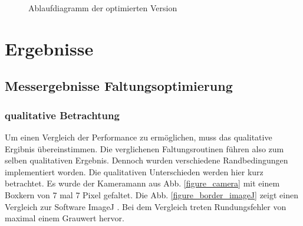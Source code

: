 \documentclass[a4paper,12pt]{article}
\begin{document}
 
\begin{figure}[htbp]
\caption{Ablaufdiagramm der optimierten Version}%
\label{figure_konverg_ablauf}
\end{figure}

\newpage
\section{Ergebnisse}
\subsection{Messergebnisse Faltungsoptimierung}\label{chp:mess_faltungen}

\subsubsection{qualitative Betrachtung}
Um einen Vergleich der Performance zu ermöglichen, muss das qualitative Ergibnis
übereinstimmen. Die verglichenen Faltungsroutinen führen also zum selben
qualitativen Ergebnis. Dennoch wurden verschiedene Randbedingungen implementiert
worden. Die qualitativen Unterschieden werden hier kurz betrachtet.
Es wurde der Kameramann aus
Abb. \ref{figure_camera} mit einem Boxkern von 7 mal 7 Pixel gefaltet.
Die Abb. \ref{figure_border_imageJ} zeigt einen Vergleich zur Software ImageJ
\cite{imageJ}.
Bei dem Vergleich treten Rundungsfehler von maximal einem Grauwert hervor.
\end{document}
